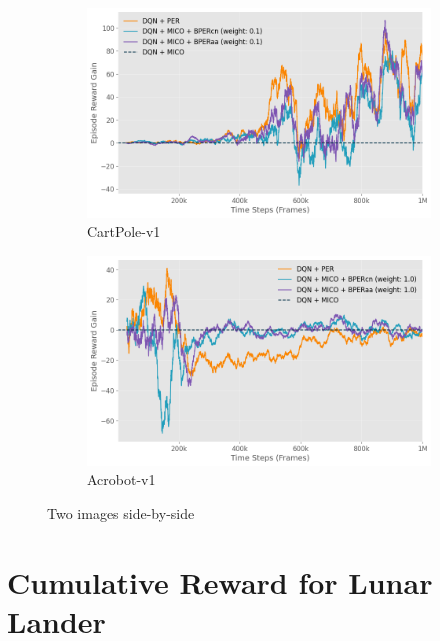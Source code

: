 \begin{figure}[h]
    \begin{subfigure}{0.45\textwidth}
        \includegraphics[width=\linewidth]{Results/general_results/cart_polev1_reward_gain_vs_dqn_mico.png}
        \caption{CartPole-v1}
        \label{fig:cart_polev1_reward_gain_vs_dqn_mico}
    \end{subfigure}
    \hfill
    \begin{subfigure}{0.45\textwidth}
        \includegraphics[width=\linewidth]{Results/general_results/acrobotv1_reward_gain_vs_dqn_mico.png}
        \caption{Acrobot-v1}
        \label{fig:acrobotv1_reward_gain_vs_dqn_mico}
    \end{subfigure}
    \caption{Two images side-by-side}
    \label{fig:reward_gain_vs_dqn_mico_methods}
\end{figure}

\section{Cumulative Reward for Lunar Lander}

